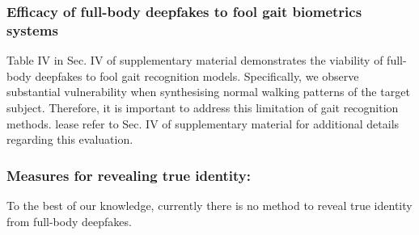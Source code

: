 \subsubsection{Efficacy of full-body deepfakes to fool gait biometrics systems} Table IV in Sec. IV of supplementary material demonstrates the viability of full-body deepfakes to fool gait recognition models. Specifically, we observe substantial vulnerability when synthesising normal walking patterns of the target subject. Therefore, it is important to address this limitation of gait recognition methods. lease refer to Sec. IV of supplementary
material for additional details regarding this evaluation.

\subsubsection{Measures for revealing true identity: }To the best of our knowledge, currently there is no method to reveal true identity from full-body deepfakes.
